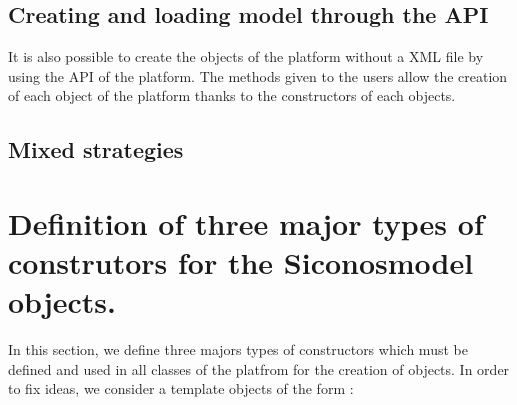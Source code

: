 \subsection{Creating and loading model through the API}

It is also  possible to create the objects of the platform without a XML file by using the API of the platform. The methods given to the users allow the creation of each object of the platform thanks to the constructors of each objects.


\subsection{Mixed strategies}


\section{Definition of three major types of construtors for the Siconosmodel objects.}



In this section, we define three majors types of constructors which must be defined and used in all classes of the platfrom for the creation of objects. In order to fix ideas, we consider a template objects of the form :

  



   





